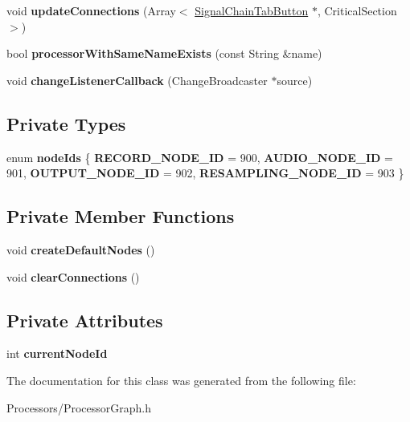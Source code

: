 \begin{DoxyCompactItemize}
\item 
\hypertarget{classProcessorGraph_ae183b5807e57ec401d4d3517fc457e2a}{void {\bfseries update\-Connections} (Array$<$ \hyperlink{classSignalChainTabButton}{Signal\-Chain\-Tab\-Button} $\ast$, Critical\-Section $>$)}\label{classProcessorGraph_ae183b5807e57ec401d4d3517fc457e2a}

\item 
\hypertarget{classProcessorGraph_a7ddf86dcf1c88e6da9095396734d560c}{bool {\bfseries processor\-With\-Same\-Name\-Exists} (const String \&name)}\label{classProcessorGraph_a7ddf86dcf1c88e6da9095396734d560c}

\item 
\hypertarget{classProcessorGraph_ae9c9c8963bd984fe099792770a64d596}{void {\bfseries change\-Listener\-Callback} (Change\-Broadcaster $\ast$source)}\label{classProcessorGraph_ae9c9c8963bd984fe099792770a64d596}

\end{DoxyCompactItemize}
\subsection*{Private Types}
\begin{DoxyCompactItemize}
\item 
enum {\bfseries node\-Ids} \{ {\bfseries R\-E\-C\-O\-R\-D\-\_\-\-N\-O\-D\-E\-\_\-\-I\-D} =  900, 
{\bfseries A\-U\-D\-I\-O\-\_\-\-N\-O\-D\-E\-\_\-\-I\-D} =  901, 
{\bfseries O\-U\-T\-P\-U\-T\-\_\-\-N\-O\-D\-E\-\_\-\-I\-D} =  902, 
{\bfseries R\-E\-S\-A\-M\-P\-L\-I\-N\-G\-\_\-\-N\-O\-D\-E\-\_\-\-I\-D} =  903
 \}
\end{DoxyCompactItemize}
\subsection*{Private Member Functions}
\begin{DoxyCompactItemize}
\item 
\hypertarget{classProcessorGraph_a3f10a351d6c862e4496b52a45d69b908}{void {\bfseries create\-Default\-Nodes} ()}\label{classProcessorGraph_a3f10a351d6c862e4496b52a45d69b908}

\item 
\hypertarget{classProcessorGraph_a8a04cdeb5ab26780f2aac2ff3335c6d2}{void {\bfseries clear\-Connections} ()}\label{classProcessorGraph_a8a04cdeb5ab26780f2aac2ff3335c6d2}

\end{DoxyCompactItemize}
\subsection*{Private Attributes}
\begin{DoxyCompactItemize}
\item 
\hypertarget{classProcessorGraph_a680233a4621ccf825cce29625cca6fc0}{int {\bfseries current\-Node\-Id}}\label{classProcessorGraph_a680233a4621ccf825cce29625cca6fc0}

\end{DoxyCompactItemize}


The documentation for this class was generated from the following file\-:\begin{DoxyCompactItemize}
\item 
Processors/Processor\-Graph.\-h\end{DoxyCompactItemize}
